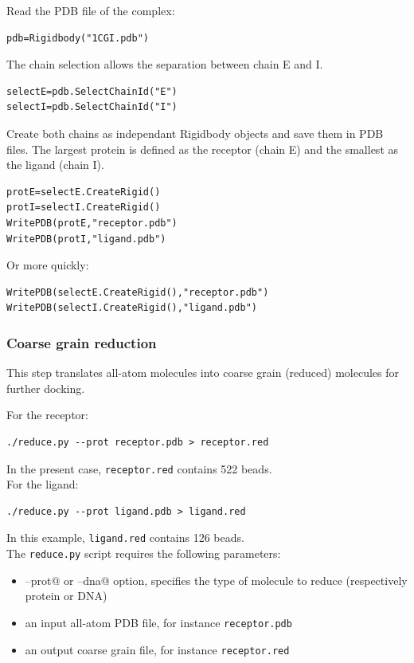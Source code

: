 \documentclass[12pt,a4paper]{article}
\begin{document}
Read the PDB file of the complex:
\begin{verbatim}
pdb=Rigidbody("1CGI.pdb")
\end{verbatim}

The chain selection allows the separation between chain E and I.
\begin{verbatim}
selectE=pdb.SelectChainId("E")
selectI=pdb.SelectChainId("I")
\end{verbatim}

Create both chains as independant Rigidbody objects and save them in PDB files. 
The largest protein is defined as the receptor (chain E) and the smallest 
as the ligand (chain I).

\begin{verbatim}
protE=selectE.CreateRigid()
protI=selectI.CreateRigid()
WritePDB(protE,"receptor.pdb")
WritePDB(protI,"ligand.pdb")
\end{verbatim}
Or more quickly:
\begin{verbatim}
WritePDB(selectE.CreateRigid(),"receptor.pdb")
WritePDB(selectI.CreateRigid(),"ligand.pdb")
\end{verbatim}

\subsubsection{Coarse grain reduction}

This step translates all-atom molecules into coarse grain (reduced) molecules for further docking. 

For the receptor: 
\begin{verbatim}
./reduce.py --prot receptor.pdb > receptor.red
\end{verbatim}
In the present case, {\tt receptor.red} contains 522 beads.\\

For the ligand:
\begin{verbatim}
./reduce.py --prot ligand.pdb > ligand.red
\end{verbatim}
In this example, {\tt ligand.red} contains 126 beads. \\

The {\tt reduce.py} script requires the following parameters:

\begin{itemize}
\item \verb@--prot@ or \verb@--dna@ option, specifies the type of molecule to reduce (respectively protein or DNA)
\item an input all-atom PDB file, for instance {\tt receptor.pdb}
\item an output coarse grain file, for instance {\tt receptor.red}
\end{itemize}
\end{document}

